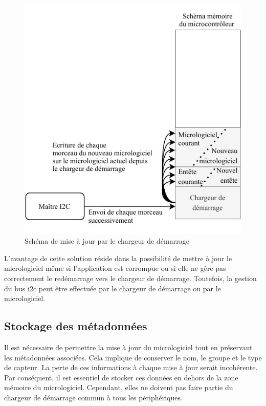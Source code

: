 \begin{figure}[H]
    \centering
    \includegraphics[scale=1.3]{./assets/figures/bootloader_update.pdf}
    \caption{Schéma de mise à jour par le chargeur de démarrage}
\end{figure}

L'avantage de cette solution réside dans la possibilité de mettre à jour le micrologiciel même si l'application est corrompue ou si elle ne gère pas correctement le redémarrage vers le chargeur de démarrage.
Toutefois, la gestion du bus \gls{i2c} peut être effectuée par le chargeur de démarrage ou par le micrologiciel.

\subsection{Stockage des métadonnées}

Il est nécessaire de permettre la mise à jour du micrologiciel tout en préservant les métadonnées associées.
Cela implique de conserver le nom, le groupe et le type de capteur.
La perte de ces informations à chaque mise à jour serait incohérente.
Par conséquent, il est essentiel de stocker ces données en dehors de la zone mémoire du micrologiciel.
Cependant, elles ne doivent pas faire partie du chargeur de démarrage commun à tous les périphériques.

